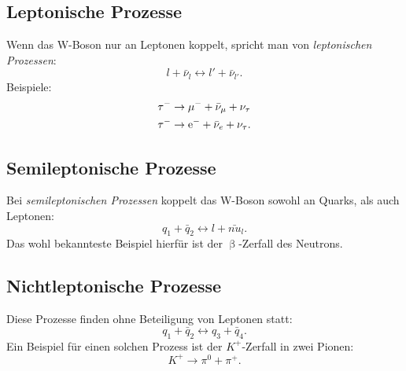 \subsection{Leptonische Prozesse}
Wenn das W-Boson nur an Leptonen koppelt, spricht man von \textit{leptonischen Prozessen}:
\begin{equation*}
	l + \bar{\nu}_l \longleftrightarrow l' + \bar{\nu}_{l'}.
\end{equation*}
Beispiele:
\begin{align*}
	\tau^- &\rightarrow \mu^- + \bar{\nu}_\mu + \nu_\tau \\
	\tau^- &\rightarrow \text{e}^- + \bar{\nu}_e + \nu_\tau.
\end{align*}

\subsection{Semileptonische Prozesse}
Bei \textit{semileptonischen Prozessen} koppelt das W-Boson sowohl an Quarks, als auch Leptonen:
\begin{equation*}
	q_1 + \bar{q}_2 \longleftrightarrow l + \bar{nu}_l.
\end{equation*}
Das wohl bekannteste Beispiel hierfür ist der $\upbeta$-Zerfall des Neutrons.

\subsection{Nichtleptonische Prozesse}
Diese Prozesse finden ohne Beteiligung von Leptonen statt:
\begin{equation*}
	q_1 + \bar{q}_2 \longleftrightarrow q_3 + \bar{q}_4.
\end{equation*}
Ein Beispiel für einen solchen Prozess ist der $K^+$-Zerfall in zwei Pionen:
\begin{equation*}
	K^+ \rightarrow \pi^0 + \pi^+.
\end{equation*}


